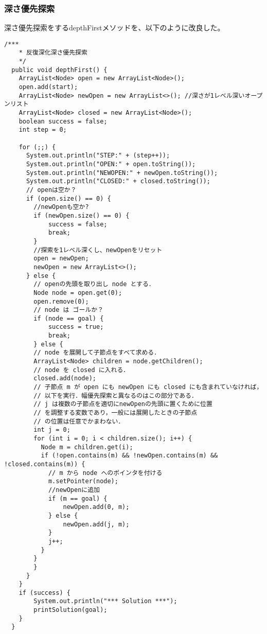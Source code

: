 \documentclass{jarticle}
\begin{document}
\subsubsection{深さ優先探索}
深さ優先探索をするdepthFirstメソッドを、以下のように改良した。
\begin{lstlisting}[caption=depthFirstメソッド,label=src:depthFirst]
  /***
    * 反復深化深さ優先探索
    */
  public void depthFirst() {
    ArrayList<Node> open = new ArrayList<Node>();
    open.add(start);
    ArrayList<Node> newOpen = new ArrayList<>(); //深さが1レベル深いオープンリスト
    ArrayList<Node> closed = new ArrayList<Node>();
    boolean success = false;
    int step = 0;

    for (;;) {
      System.out.println("STEP:" + (step++));
      System.out.println("OPEN:" + open.toString());
      System.out.println("NEWOPEN:" + newOpen.toString());
      System.out.println("CLOSED:" + closed.toString());
      // openは空か？
      if (open.size() == 0) {
        //newOpenも空か?
        if (newOpen.size() == 0) {
            success = false;
            break;
        }
        //探索を1レベル深くし、newOpenをリセット
        open = newOpen;
        newOpen = new ArrayList<>();
      } else {
        // openの先頭を取り出し node とする．
        Node node = open.get(0);
        open.remove(0);
        // node は ゴールか？
        if (node == goal) {
            success = true;
            break;
        } else {
        // node を展開して子節点をすべて求める．
        ArrayList<Node> children = node.getChildren();
        // node を closed に入れる．
        closed.add(node);
        // 子節点 m が open にも newOpen にも closed にも含まれていなければ，
        // 以下を実行．幅優先探索と異なるのはこの部分である．
        // j は複数の子節点を適切にnewOpenの先頭に置くために位置
        // を調整する変数であり，一般には展開したときの子節点
        // の位置は任意でかまわない．
        int j = 0;
        for (int i = 0; i < children.size(); i++) {
          Node m = children.get(i);
          if (!open.contains(m) && !newOpen.contains(m) && !closed.contains(m)) {
            // m から node へのポインタを付ける
            m.setPointer(node);
            //newOpenに追加
            if (m == goal) {
                newOpen.add(0, m);
            } else {
                newOpen.add(j, m);
            }
            j++;
          }
        }
        }
      }
    }
    if (success) {
        System.out.println("*** Solution ***");
        printSolution(goal);
    }
  }
  
  \end{lstlisting}
\end{document}

